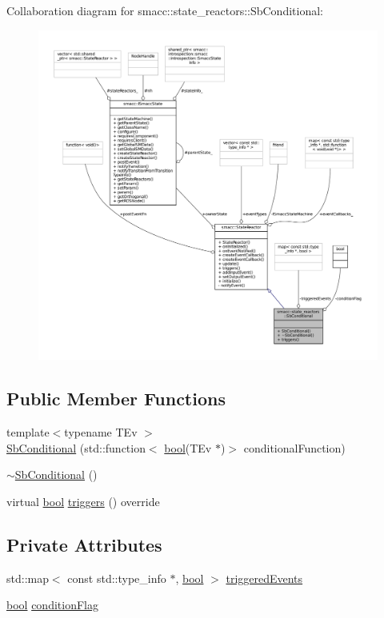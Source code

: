 Collaboration diagram for smacc\+:\+:state\+\_\+reactors\+:\+:Sb\+Conditional\+:
\nopagebreak
\begin{figure}[H]
\begin{center}
\leavevmode
\includegraphics[width=350pt]{classsmacc_1_1state__reactors_1_1SbConditional__coll__graph}
\end{center}
\end{figure}
\subsection*{Public Member Functions}
\begin{DoxyCompactItemize}
\item 
{\footnotesize template$<$typename T\+Ev $>$ }\\\hyperlink{classsmacc_1_1state__reactors_1_1SbConditional_a48db8b9ef8a28f6e239dc4ed12ea58ab}{Sb\+Conditional} (std\+::function$<$ \hyperlink{classbool}{bool}(T\+Ev $\ast$)$>$ conditional\+Function)
\item 
\hyperlink{classsmacc_1_1state__reactors_1_1SbConditional_a946f5f28f243f51a43b91712ec71a82c}{$\sim$\+Sb\+Conditional} ()
\item 
virtual \hyperlink{classbool}{bool} \hyperlink{classsmacc_1_1state__reactors_1_1SbConditional_a6a2ce0fcedf3cb4c5bcd7ebfb633574c}{triggers} () override
\end{DoxyCompactItemize}
\subsection*{Private Attributes}
\begin{DoxyCompactItemize}
\item 
std\+::map$<$ const std\+::type\+\_\+info $\ast$, \hyperlink{classbool}{bool} $>$ \hyperlink{classsmacc_1_1state__reactors_1_1SbConditional_a1dd37ec633d32afe86c8a7df475f6d53}{triggered\+Events}
\item 
\hyperlink{classbool}{bool} \hyperlink{classsmacc_1_1state__reactors_1_1SbConditional_aba41e1943a9afaabcc03b7e9fe30e6f4}{condition\+Flag}
\end{DoxyCompactItemize}
